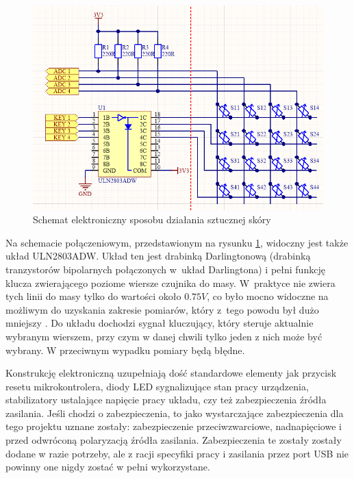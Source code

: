 \begin{figure}[!h]
    \centering 
    \includegraphics[width=0.95\linewidth]{img/elektronika_schemat.png}
    \caption{Schemat elektroniczny sposobu działania sztucznej skóry}
    \label{f_elektronika_schemat}
\end{figure}

Na schemacie połączeniowym, przedstawionym na rysunku \ref{f_elektronika_schemat}, widoczny jest także układ ULN2803ADW. Układ ten jest drabinką Darlingtonową (drabinką tranzystorów bipolarnych połączonych w~układ Darlingtona) i pełni funkcję klucza zwierającego poziome wiersze czujnika do masy. W~praktyce nie zwiera tych linii do masy tylko do wartości około $0.75 V$, co było mocno widoczne na możliwym do uzyskania zakresie pomiarów, który z~tego powodu był dużo mniejszy \cite{b_site_ULN2803}. Do układu dochodzi sygnał kluczujący, który steruje aktualnie wybranym wierszem, przy czym w danej chwili tylko jeden z nich może być wybrany. W przeciwnym wypadku pomiary będą błędne.

Konstrukcję elektroniczną uzupełniają dość standardowe elementy jak przycisk resetu mikrokontrolera, diody LED sygnalizujące stan pracy urządzenia, stabilizatory ustalające napięcie pracy układu, czy też zabezpieczenia źródła zasilania. Jeśli chodzi o zabezpieczenia, to jako wystarczające zabezpieczenia dla tego projektu uznane zostały: zabezpieczenie przeciwzwarciowe, nadnapięciowe i przed odwróconą polaryzacją źródła zasilania. Zabezpieczenia te zostały zostały dodane w razie potrzeby, ale z racji specyfiki pracy i zasilania przez port USB nie powinny one nigdy zostać w pełni wykorzystane.


